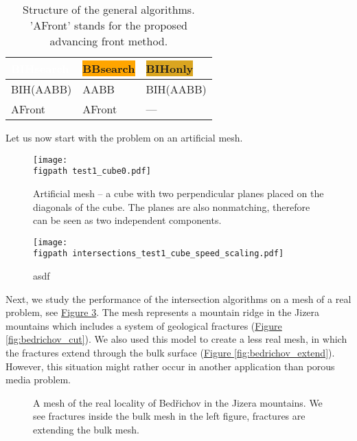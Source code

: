 \documentclass{elsarticle}
\newcommand{\fig}[1]{\hyperref[#1]{Figure \ref{#1}}}
\newcommand{\figpath}{figures/}
\begin{document}
\begin{table}[!htb]
    \centering
    \renewcommand{\arraystretch}{1.2}
    \begin{tabular}{>{\centering\arraybackslash}p{20ex}
                    >{\centering\arraybackslash}p{20ex}
                    >{\centering\arraybackslash}p{20ex}}
        \colorbox{NavyBlue}{\textcolor{white}{BIHsearch\vphantom{By}}} & \colorbox{orange}{BBsearch\vphantom{By}} & \colorbox{Goldenrod}{BIHonly\vphantom{By}} \\ \hline
        BIH(AABB) & AABB & BIH(AABB) \\
        AFront & AFront & ---
    \end{tabular}
    \caption{Structure of the general algorithms. 'AFront' stands for the proposed advancing front method.}
    \label{tab:search_algorithms}
\end{table}

Let us now start with the problem on an artificial mesh. 

\begin{figure}[!htb]
    \centering
    \texttt{[image: \\figpath test1\_cube0.pdf]}
    \caption{Artificial mesh -- a cube with two perpendicular planes placed on the diagonals of the cube.
             The planes are also nonmatching, therefore can be seen as two independent components.}
    \label{fig:cube_mesh}
\end{figure}
  
\begin{figure}[!htb]
    \centering
    \texttt{[image: \\figpath intersections\_test1\_cube\_speed\_scaling.pdf]}
    \caption{asdf}
    \label{fig:cube_speed}
\end{figure}


Next, we study the performance of the intersection algorithms on a mesh of a real problem, see \fig{fig:bedrichov_meshes}. The mesh represents a mountain ridge in the Jizera mountains which 
includes a system of geological fractures (\fig{fig:bedrichov_cut}). We also used this model to create
a less real mesh, in which the fractures extend through the bulk surface (\fig{fig:bedrichov_extend}). 
However, this situation might rather occur in another application than porous media problem.

\begin{figure}[!htb]
    \hspace{3pt}
    \caption{A mesh of the real locality of Bed{\v r}ichov in the Jizera mountains.
             We see fractures inside the bulk mesh in the left figure,
             fractures are extending the bulk mesh.}
    \label{fig:bedrichov_meshes}
\end{figure}
\end{document}
